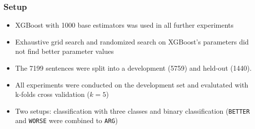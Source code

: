 \documentclass[11pt,aspectratio=169]{beamer}
\begin{document}
    \begin{frame}
        \frametitle{Setup}
        \begin{itemize}
            \item XGBoost with 1000 base estimators was used in all further experiments
            \item Exhaustive grid search and randomized search on XGBoost's parameters did not find better parameter values
            \item The 7199 sentences were split into a development (5759) and held-out (1440).
            \item All experiments were conducted on the development set and evalutated with k-folds cross validation ($k = 5$)
            \item Two setups: classification with three classes and binary classification (\texttt{BETTER} and \texttt{WORSE} were combined to \texttt{ARG})
        \end{itemize}

    \end{frame}
\end{document}
